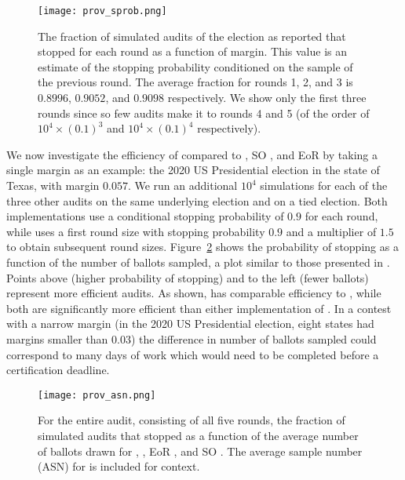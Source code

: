 \begin{figure}[h!]
\texttt{[image: prov\_sprob.png]}
\caption{The fraction of simulated \Providence audits of the election as reported that stopped for each round as a function of margin. This value is an estimate of the stopping probability conditioned on the sample of the previous round. The average fraction for rounds 1, 2, and 3 is $0.8996$, $0.9052$, and $0.9098$ respectively. We show only the first three rounds since so few audits make it to rounds 4 and 5 (of the order of $10^4 \times (0.1)^3$ and $10^4 \times (0.1)^4$ respectively).}
\label{fig:prov-sprob}
\end{figure}

We now investigate the efficiency of \Providence compared to \Minerva, SO \BRAVO, and EoR \BRAVO by taking a single margin as an example: the 2020 US Presidential election in the state of Texas, with margin $0.057$. We run an additional $10^4$ simulations for each of the three other audits on the same underlying election and on a tied election. Both \BRAVO implementations use a conditional stopping probability of $0.9$ for each round, while \Minerva uses a first round size with stopping probability $0.9$ and a multiplier of $1.5$ to obtain subsequent round sizes. Figure~\ref{fig:prov-asn} shows the probability of stopping as a function of the number of ballots sampled, a plot similar to those presented in \cite{simulations}. Points above (higher probability of stopping) and to the left (fewer ballots) represent more efficient audits. As shown, \Providence has comparable efficiency to \Minerva, while both are significantly more efficient than either implementation of \BRAVO. In a contest with a narrow margin (in the 2020 US Presidential election, eight states had margins smaller than $0.03$) the difference in number of ballots sampled could correspond to many days of work which would need to be completed before a certification deadline.

\begin{figure}
\texttt{[image: prov\_asn.png]}
\caption{For the entire audit, consisting of all five rounds, the fraction of simulated audits that stopped as a function of the average number of ballots drawn for \Providence, \Minerva, EoR \BRAVO, and SO \BRAVO. The average sample number (ASN) for \B \BRAVO is included for context.}
\label{fig:prov-asn}
\end{figure}

\newpage






